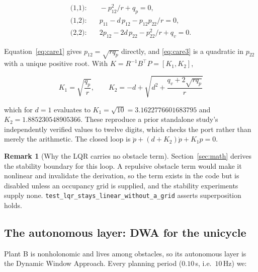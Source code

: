 \documentclass[11pt,a4paper]{article}
\theoremstyle{plain}
\theoremstyle{definition}
\newtheorem{remark}{Remark}
\begin{document}
\begin{align}
\text{(1,1)}: &\quad -p_{12}^2/r + q_p = 0, \label{eq:care1}\\
\text{(1,2)}: &\quad p_{11} - d\,p_{12} - p_{12}p_{22}/r = 0, \label{eq:care2}\\
\text{(2,2)}: &\quad 2p_{12} - 2d\,p_{22} - p_{22}^2/r + q_v = 0. \label{eq:care3}
\end{align}

Equation~\eqref{eq:care1} gives $p_{12} = \sqrt{r q_p}$ directly, and
\eqref{eq:care3} is a quadratic in $p_{22}$ with a unique positive root.
With $K = R^{-1}B^{\!\top}P = [K_1, K_2]$,

\begin{equation}
\boxed{\;
K_1 = \sqrt{\frac{q_p}{r}},
\qquad
K_2 = -d + \sqrt{d^2 + \frac{q_v + 2\sqrt{r q_p}}{r}}\;}
\label{eq:lqrgains}
\end{equation}

which for $d = 1$ evaluates to
$K_1 = \sqrt{10} = 3.1622776601683795$ and
$K_2 = 1.885230548905366$. These reproduce a prior standalone study's
independently verified values to twelve digits, which checks the port
rather than merely the arithmetic. The closed loop is
$\ddot p + (d + K_2)\dot p + K_1 p = 0$.

\begin{remark}[Why the LQR carries no obstacle term]
Section~\ref{sec:math} derives the stability boundary for this loop. A
repulsive obstacle term would make it nonlinear and invalidate the
derivation, so the term exists in the code but is disabled unless an
occupancy grid is supplied, and the stability experiments supply none.
\texttt{test\_lqr\_stays\_linear\_without\_a\_grid} asserts
superposition holds.
\end{remark}

\subsection{The autonomous layer: DWA for the unicycle}
\label{sec:dwa}

Plant B is nonholonomic and lives among obstacles, so its autonomous
layer is the Dynamic Window Approach. Every planning period
($0.10$\,s, i.e.\ $10$\,Hz) we:
\end{document}
